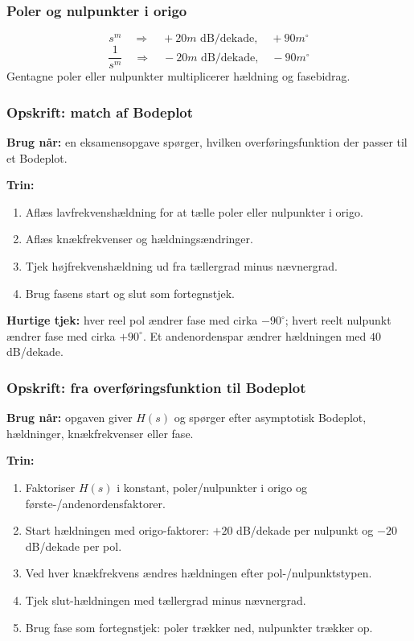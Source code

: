 \subsubsection{Poler og nulpunkter i origo}
\[
s^m\quad\Rightarrow\quad +20m\text{ dB/dekade},\quad +90m^\circ
\]
\[
\frac{1}{s^m}\quad\Rightarrow\quad -20m\text{ dB/dekade},\quad -90m^\circ
\]
Gentagne poler eller nulpunkter multiplicerer hældning og fasebidrag.

\subsubsection{Opskrift: match af Bodeplot}
\textbf{Brug når:} en eksamensopgave spørger, hvilken overføringsfunktion der passer til et Bodeplot.

\textbf{Trin:}
\begin{enumerate}
    \item Aflæs lavfrekvenshældning for at tælle poler eller nulpunkter i origo.
    \item Aflæs knækfrekvenser og hældningsændringer.
    \item Tjek højfrekvenshældning ud fra tællergrad minus nævnergrad.
    \item Brug fasens start og slut som fortegnstjek.
\end{enumerate}

\textbf{Hurtige tjek:} hver reel pol ændrer fase med cirka \(-90^\circ\); hvert reelt nulpunkt ændrer fase med cirka \(+90^\circ\). Et andenordenspar ændrer hældningen med \(40\) dB/dekade.

\subsubsection{Opskrift: fra overføringsfunktion til Bodeplot}
\textbf{Brug når:} opgaven giver \(H(s)\) og spørger efter asymptotisk Bodeplot, hældninger, knækfrekvenser eller fase.

\textbf{Trin:}
\begin{enumerate}
    \item Faktoriser \(H(s)\) i konstant, poler/nulpunkter i origo og første-/andenordensfaktorer.
    \item Start hældningen med origo-faktorer: \(+20\) dB/dekade per nulpunkt og \(-20\) dB/dekade per pol.
    \item Ved hver knækfrekvens ændres hældningen efter pol-/nulpunktstypen.
    \item Tjek slut-hældningen med tællergrad minus nævnergrad.
    \item Brug fase som fortegnstjek: poler trækker ned, nulpunkter trækker op.
\end{enumerate}

